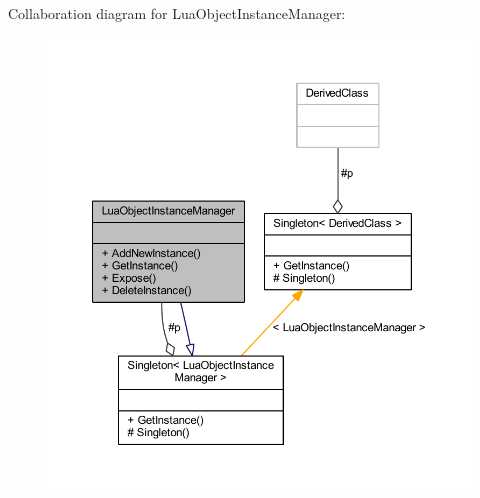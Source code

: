 Collaboration diagram for Lua\+Object\+Instance\+Manager\+:\nopagebreak
\begin{figure}[H]
\begin{center}
\leavevmode
\includegraphics[width=350pt]{class_lua_object_instance_manager__coll__graph}
\end{center}
\end{figure}
